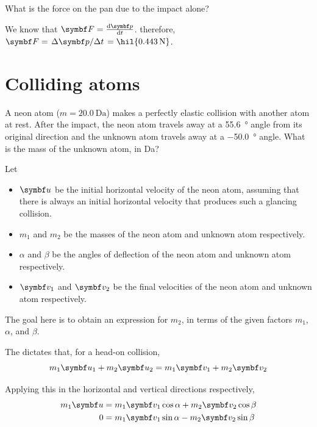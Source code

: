 \begin{problem}
  What is the force on the pan due to the impact alone?
\end{problem}
We know that \(\mv{F} = \odv{\mv{p}}{t}\). therefore, \(\mv{F} =
\lf{\Delta\mv{p}}{\Delta t} = \hil{\qty{0.443}{\newton}}\).


\section{Colliding atoms}
\begin{problem}
  A neon atom (\(m = \qty{20.0}{\dalton}\)) makes a perfectly elastic
  collision with another atom at rest.
  After the impact, the neon atom travels away at a \qty{55.6}{\degree}
  angle from its original direction
  and the unknown atom travels away at a \qty{-50.0}{\degree} angle.
  What is the mass of the unknown atom, in \unit{\dalton}?
\end{problem}

Let
\begin{itemize}
  \item \(\mv{u}\) be the initial horizontal velocity of the neon
    atom, assuming that there is always an initial horizontal
    velocity that produces such a glancing collision.
  \item \(m_1\) and \(m_2\) be the masses of the neon atom and
    unknown atom respectively.
  \item \(\alpha\) and \(\beta\) be the angles of deflection of the
    neon atom and unknown atom respectively.
  \item \(\mv{v}_1\) and \(\mv{v}_2\) be the final velocities of the
    neon atom and unknown atom respectively.
\end{itemize}
The goal here is to obtain an expression for \(m_2\), in terms of the
given factors
\(m_1\), \(\alpha\), and \(\beta\).

The  dictates that, for a
head-on collision,
\begin{equation}
  m_1\mv{u}_1 + m_2\mv{u}_2 = m_1\mv{v}_1 + m_2\mv{v}_2
\end{equation}

Applying this in the horizontal and vertical directions respectively,
\begin{align}
  \label{eq:pconvx}
  m_1\mv{u} &= m_1\mv{v}_1 \cos\alpha + m_2\mv{v}_2 \cos \beta \\
  0 &= m_1\mv{v}_1 \sin \alpha - m_2\mv{v}_2 \sin \beta
  \label{eq:pconvy}
\end{align}


